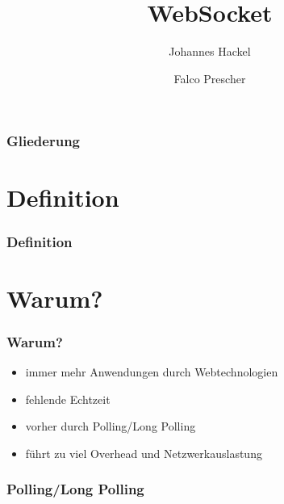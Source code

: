 \documentclass{beamer}
\author{Johannes Hackel\and Falco Prescher}
\title{WebSocket}
\begin{document}
\begin{frame}
\titlepage
\end{frame}

\begin{frame}
\frametitle{Gliederung}
\tableofcontents
\end{frame}

\section{Definition}
\begin{frame}
\frametitle{Definition}
\end{frame}

\section{Warum?}
\begin{frame}
\frametitle{Warum?}

\begin{itemize}
\item immer mehr Anwendungen durch Webtechnologien
\item fehlende Echtzeit
\item vorher durch Polling/Long Polling
\item führt zu viel Overhead und Netzwerkauslastung
\end{itemize}

\end{frame}


\begin{frame}
\frametitle{Polling/Long Polling}
\begin{figure}
\end{figure}
\end{frame}
\end{document}
